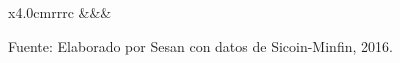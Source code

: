 {\begin{center}
\begin{tabular}{x{4.0cm}rrrc}
			\hline
			&&&\\[-0.36cm]\end{tabular}\addtocounter{Cuadro}{1}
	\end{center}
	{\footnotesize Fuente:  Elaborado por Sesan con datos de Sicoin-Minfin, 2016.}\\[.1cm]
}






